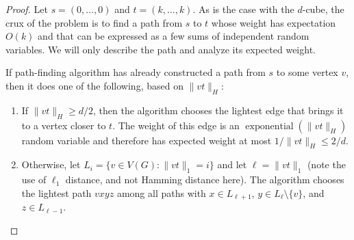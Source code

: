\documentclass[lotsofwhite]{patmorin}
\DeclareMathOperator{\exponential}{exponential}
\begin{document}
\begin{proof}
Let $s=(0,\ldots,0)$ and $t=(k,\ldots,k)$.  As is the case with the
$d$-cube, the crux of the problem is to find a path from $s$ to $t$
whose weight has expectation $O(k)$ and that can be expressed as a few
sums of independent random variables. We will only describe the path and
analyze its expected weight.

If path-finding algorithm has already constructed a path from $s$ to
some vertex $v$, then it does one of the following, based on $\|vt\|_H$:
\begin{enumerate}

  \item If $\|vt\|_H \ge d/2$, then the algorithm chooses the lightest 
    edge that brings it to a vertex closer to $t$.  The weight of this
    edge is an $\exponential(\|vt\|_H)$ random variable and therefore has
    expected weight at most $1/\|vt\|_H \le 2/d$.

  \item Otherwise, let $L_i = \{v\in V(G): \|vt\|_1=i\}$ and let
    $\ell=\|vt\|_1$ (note the use of $\ell_1$ distance, and not Hamming
    distance here).  The algorithm chooses the lightest path $vxyz$ among
    all paths with $x\in L_{\ell+1}$,  $y\in L_{\ell}\setminus\{v\}$,
    and $z\in L_{\ell-1}$.


\end{enumerate}
\end{proof}
\end{document}
